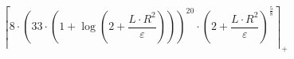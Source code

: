 \[\left\lceil 8 \cdot \left(33 \cdot \left(1 + \log\left(2 + \frac{L \cdot R^{2}}{\varepsilon}\right)\right)\right)^{20} \cdot \left(2 + \frac{L \cdot R^{2}}{\varepsilon}\right)^{\frac{5}{8}} \right\rceil_{+}\]
